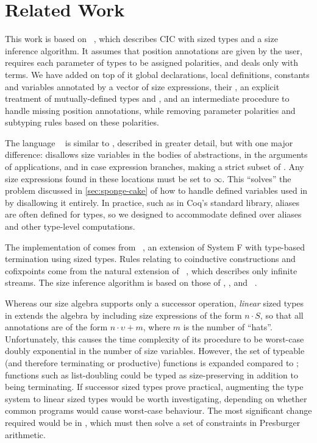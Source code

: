 \section{Related Work}\label{sec:related}

This work is based on \CIChat~\cite{cic-hat}, which describes CIC with sized types and a size inference algorithm.
It assumes that position annotations are given by the user, requires each parameter of \coinductive types to be assigned polarities, and deals only with terms.
We have added on top of it global declarations, local definitions, constants and variables annotated by a vector of size expressions, their \deltaDeltareductions, an explicit treatment of mutually-defined \coinductive types and \cofixpoints, and an intermediate procedure \RecCheckLoop to handle missing position annotations, while removing parameter polarities and subtyping rules based on these polarities.

The language \CIChatminus~\cite{cic-hat-minus} is similar to \CIChat, described in greater detail, but with one major difference: \CIChatminus disallows size variables in the bodies of abstractions, in the arguments of applications, and in case expression branches, making \CIChatminus a strict subset of \CIChat.
Any size expressions found in these locations must be set to $\infty$.
This ``solves'' the problem discussed in \autoref{sec:sponge-cake} of how to handle defined variables used in \cofixpoints by disallowing it entirely.
In practice, such as in Coq's standard library, aliases are often defined for \coinductive types, so we designed \lang to accommodate \cofixpoints defined over aliases and other type-level computations.

The implementation of \RecCheck comes from \Fhat~\cite{f-hat}, an extension of System F with type-based termination using sized types.
Rules relating to coinductive constructions and cofixpoints come from the natural extension of \CChatomega~\cite{cc-hat-omega}, which describes only infinite streams.
The size inference algorithm is based on those of \CIChat, \CChatomega, and \CIChatl~\cite{cic-hat-l}.

Whereas our size algebra supports only a successor operation, \emph{linear} sized types in \CIChatl extends the algebra by including size expressions of the form $n \cdot S$, so that all annotations are of the form $n \cdot \upsilon + m$, where $m$ is the number of ``hats''.
Unfortunately, this causes the time complexity of its \RecCheck procedure to be worst-case doubly exponential in the number of size variables.
However, the set of typeable (and therefore terminating or productive) functions is expanded compared to \lang; functions such as list-doubling could be typed as size-preserving in addition to being terminating.
If successor sized types prove practical, augmenting the type system to linear sized types would be worth investigating, depending on whether common programs would cause worst-case behaviour.
The most significant change required would be in \RecCheck, which must then solve a set of constraints in Presburger arithmetic.

